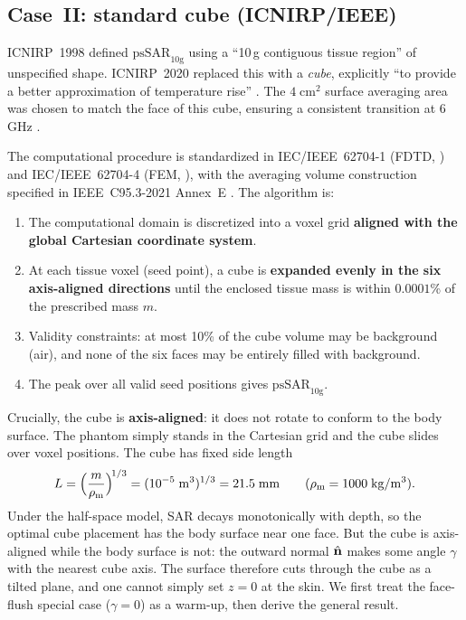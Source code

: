 \documentclass[11pt,a4paper]{article}
\theoremstyle{definition}
\theoremstyle{remark}
\newcommand{\nhat}{\hat{\vb{n}}}
\newcommand{\psSAR}{\ensuremath{\mathrm{psSAR}_{10\mathrm{g}}}}
\newcommand{\rhom}{\rho_{\mathrm{m}}}
\begin{document}
\subsection{Case~II: standard cube (ICNIRP/IEEE)}
\label{sec:cube}

ICNIRP~1998 defined \psSAR{} using a ``10\,g contiguous tissue region'' of
unspecified shape.  ICNIRP~2020 replaced this with a \emph{cube}, explicitly
``to provide a better approximation of temperature rise''
\cite{ICNIRP2020,ICNIRPdiff}.  The $4\;\mathrm{cm}^2$ surface averaging area
was chosen to match the face of this cube, ensuring a consistent transition at
6\,GHz \cite{ICNIRPdiff}.

The computational procedure is standardized in IEC/IEEE~62704-1
(FDTD, \cite{62704-1}) and IEC/IEEE~62704-4 (FEM, \cite{62704-4}), with the
averaging volume construction specified in IEEE~C95.3-2021 Annex~E
\cite{C953}. The algorithm is:

\begin{enumerate}[nosep]
\item The computational domain is discretized into a voxel grid
  \textbf{aligned with the global Cartesian coordinate system}.
\item At each tissue voxel (seed point), a cube is \textbf{expanded evenly in
  the six axis-aligned directions} until the enclosed tissue mass is within
  $0.0001$\% of the prescribed mass $m$.
\item Validity constraints: at most 10\% of the cube volume may be background
  (air), and none of the six faces may be entirely filled with background.
\item The peak over all valid seed positions gives \psSAR.
\end{enumerate}

\noindent
Crucially, the cube is \textbf{axis-aligned}: it does not rotate to conform to
the body surface.  The phantom simply stands in the Cartesian grid and the cube
slides over voxel positions.  The cube has fixed side length
\begin{equation}\label{eq:cube-L}
  L = \Bigl(\frac{m}{\rhom}\Bigr)^{\!1/3}
  = (10^{-5}\;\mathrm{m}^3)^{1/3}
  = 21.5\;\mathrm{mm}
  \qquad (\rhom = 1000\;\mathrm{kg/m^3}).
\end{equation}
Under the half-space model, SAR decays monotonically with depth, so the optimal
cube placement has the body surface near one face.  But the cube is
axis-aligned while the body surface is not: the outward normal $\nhat$ makes
some angle $\gamma$ with the nearest cube axis.  The surface therefore cuts
through the cube as a tilted plane, and one cannot simply set $z = 0$ at the
skin.  We first treat the face-flush special case ($\gamma = 0$) as a warm-up,
then derive the general result.
\end{document}
